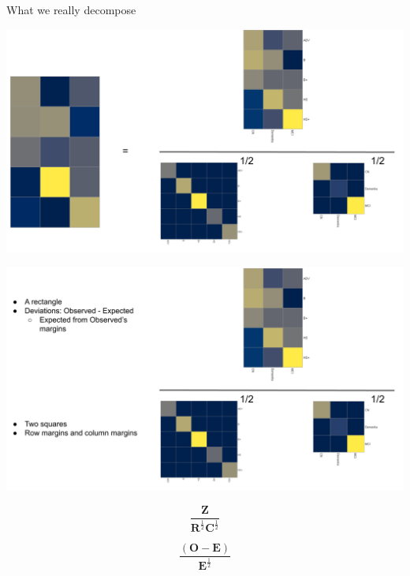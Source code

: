 \documentclass[
  ignorenonframetext,
]{beamer}
\begin{document}
\begin{frame}{What we really decompose}
\protect\hypertarget{what-we-really-decompose}{}

\includegraphics{../images/Deviations_Over_2.png}

\end{frame}

\begin{frame}

\includegraphics{../images/Deviations_Over.png}

\end{frame}

\begin{frame}

\begingroup\Huge

\begin{equation*}
\frac{\mathbf{Z}}{\mathbf{R}^{\frac{1}{2}}\mathbf{C}^{\frac{1}{2}}}
\end{equation*} \endgroup

\end{frame}

\begin{frame}

\begingroup\Huge

\begin{equation*}
\frac{(\mathbf{O} - \mathbf{E})}{\mathbf{E}^{\frac{1}{2}}}
\end{equation*} \endgroup

\end{frame}
\end{document}
